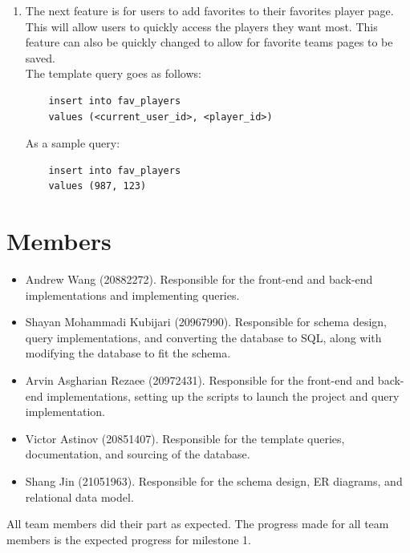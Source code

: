 \documentclass[11pt]{article}
\begin{document}
\begin{enumerate}
\item The next feature is for users to add favorites to their favorites player page. This will allow users to quickly access the players they want most. This feature can also be quickly changed to allow for favorite teams pages to be saved. \\
The template query goes as follows:
\begin{verbatim}
    insert into fav_players
    values (<current_user_id>, <player_id>)
\end{verbatim}

As a sample query:
\begin{verbatim}
    insert into fav_players
    values (987, 123)
\end{verbatim}
\end{enumerate}

\section{Members}
\begin{itemize}
    \item Andrew Wang (20882272). Responsible for the front-end and back-end implementations and implementing queries.
    \item Shayan Mohammadi Kubijari (20967990). Responsible for schema design, query implementations, and converting the database to SQL, along with modifying the database to fit the schema.
    \item Arvin Asgharian Rezaee (20972431). Responsible for the front-end and back-end implementations, setting up the scripts to launch the project and query implementation.
    \item Victor Astinov (20851407). Responsible for the template queries, documentation, and sourcing of the database.
    \item Shang Jin (21051963). Responsible for the schema design, ER diagrams, and relational data model.
\end{itemize}

All team members did their part as expected. The progress made for all team members is the expected progress for milestone 1.
\end{document}
